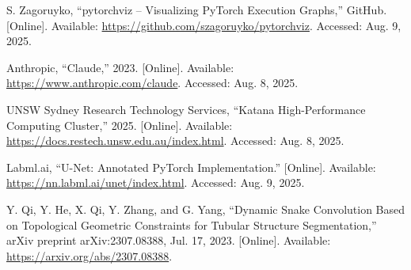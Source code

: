 \begin{thebibliography}{00}
 S. Zagoruyko, ``pytorchviz -- Visualizing PyTorch Execution Graphs,'' GitHub. [Online]. Available: \url{https://github.com/szagoruyko/pytorchviz}. Accessed: Aug. 9, 2025.

 Anthropic, ``Claude,'' 2023. [Online]. Available: \url{https://www.anthropic.com/claude}. Accessed: Aug. 8, 2025.

 UNSW Sydney Research Technology Services, ``Katana High-Performance Computing Cluster,'' 2025. [Online]. Available: \url{https://docs.restech.unsw.edu.au/index.html}. Accessed: Aug. 8, 2025.

 Labml.ai, ``U-Net: Annotated PyTorch Implementation.'' [Online]. Available: \url{https://nn.labml.ai/unet/index.html}. Accessed: Aug. 9, 2025.

 Y. Qi, Y. He, X. Qi, Y. Zhang, and G. Yang, ``Dynamic Snake Convolution Based on Topological Geometric Constraints for Tubular Structure Segmentation,'' arXiv preprint arXiv:2307.08388, Jul. 17, 2023. [Online]. Available: \url{https://arxiv.org/abs/2307.08388}.

\end{thebibliography}